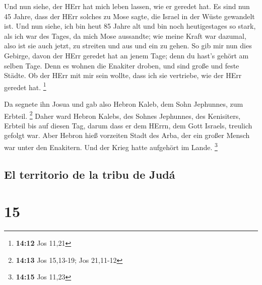  Und nun siehe, der HErr hat mich leben lassen, wie er
geredet hat. Es sind nun 45 Jahre, dass der HErr solches zu Mose sagte,
die Israel in der Wüste gewandelt ist. Und nun siehe, ich bin heut 85
Jahre alt  und bin noch heutigestages so stark, als ich
war des Tages, da mich Mose aussandte; wie meine Kraft war dazumal, also
ist sie auch jetzt, zu streiten und aus und ein zu gehen.
 So gib mir nun dies Gebirge, davon der HErr geredet hat
an jenem Tage; denn du hast's gehört am selben Tage. Denn es wohnen die
Enakiter droben, und sind große und feste Städte. Ob der HErr mit mir
sein wollte, dass ich sie vertriebe, wie der HErr geredet hat.
\footnote{\textbf{14:12} Jos 11,21}

 Da segnete ihn Josua und gab also Hebron Kaleb, dem Sohn
Jephunnes, zum Erbteil. \footnote{\textbf{14:13} Jos 15,13-19; Jos
  21,11-12}  Daher ward Hebron Kalebs, des Sohnes
Jephunnes, des Kenisiters, Erbteil bis auf diesen Tag, darum dass er dem
HErrn, dem Gott Israels, treulich gefolgt war.  Aber
Hebron hieß vorzeiten Stadt des Arba, der ein großer Mensch war unter
den Enakitern. Und der Krieg hatte aufgehört im Lande. \footnote{\textbf{14:15}
  Jos 11,23}

\hypertarget{el-territorio-de-la-tribu-de-juduxe1}{%
\subsection{El territorio de la tribu de
Judá}\label{el-territorio-de-la-tribu-de-juduxe1}}

\hypertarget{section-14}{%
\section{15}\label{section-14}}

